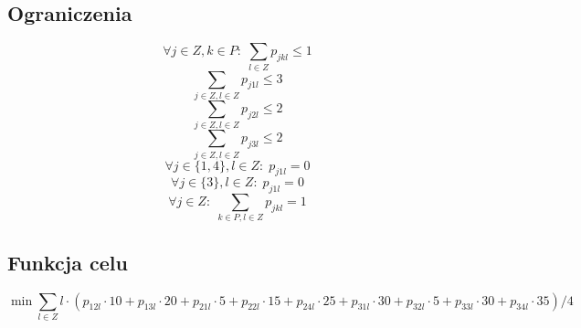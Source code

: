 \documentclass{article}
\begin{document}
\subsection*{Ograniczenia}
$$\forall j \in Z, k \in P: \; \sum_{l \in Z} p_{jkl} \le 1$$
$$\sum_{j \in Z, l \in Z} p_{j1l} \le 3 $$
$$\sum_{j \in Z, l \in Z} p_{j2l} \le 2 $$
$$\sum_{j \in Z, l \in Z} p_{j3l} \le 2 $$
$$\forall j \in \{1, 4\}, l \in Z: \; p_{j1l} = 0$$
$$\forall j \in \{3\}, l \in Z: \; p_{j1l} = 0$$
$$\forall j \in Z: \; \sum_{k \in P, l \in Z} p_{jkl} = 1$$

\subsection*{Funkcja celu}
$$\min{\sum_{l \in Z} l \cdot (
        p_{12l} \cdot 10 +
        p_{13l} \cdot 20 +
        p_{21l} \cdot 5 +
        p_{22l} \cdot 15 +
        p_{24l} \cdot 25 +
        p_{31l} \cdot 30 +
        p_{32l} \cdot 5 +
        p_{33l} \cdot 30 +
        p_{34l} \cdot 35
        ) / 4}$$
\end{document}
